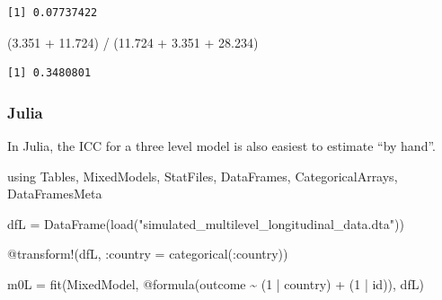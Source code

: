 \documentclass[
  letterpaper,
  DIV=11,
  numbers=noendperiod]{scrreprt}
\newenvironment{Shaded}{\begin{snugshade}}{\end{snugshade}}
\newcommand{\BuiltInTok}[1]{\textcolor[rgb]{0.00,0.23,0.31}{#1}}
\newcommand{\FloatTok}[1]{\textcolor[rgb]{0.68,0.00,0.00}{#1}}
\newcommand{\FunctionTok}[1]{\textcolor[rgb]{0.28,0.35,0.67}{#1}}
\newcommand{\ImportTok}[1]{\textcolor[rgb]{0.00,0.46,0.62}{#1}}
\newcommand{\NormalTok}[1]{\textcolor[rgb]{0.00,0.23,0.31}{#1}}
\newcommand{\OperatorTok}[1]{\textcolor[rgb]{0.37,0.37,0.37}{#1}}
\newcommand{\PreprocessorTok}[1]{\textcolor[rgb]{0.68,0.00,0.00}{#1}}
\newcommand{\SpecialCharTok}[1]{\textcolor[rgb]{0.37,0.37,0.37}{#1}}
\newcommand{\StringTok}[1]{\textcolor[rgb]{0.13,0.47,0.30}{#1}}
\begin{document}
\begin{verbatim}
[1] 0.07737422
\end{verbatim}

\begin{Shaded}
\begin{Highlighting}[]
\NormalTok{(}\FloatTok{3.351} \SpecialCharTok{+} \FloatTok{11.724}\NormalTok{) }\SpecialCharTok{/}\NormalTok{ (}\FloatTok{11.724} \SpecialCharTok{+} \FloatTok{3.351} \SpecialCharTok{+} \FloatTok{28.234}\NormalTok{)}
\end{Highlighting}
\end{Shaded}

\begin{verbatim}
[1] 0.3480801
\end{verbatim}

\subsubsection{Julia}

In Julia, the ICC for a three level model is also easiest to estimate
``by hand''.

\begin{Shaded}
\begin{Highlighting}[]
\ImportTok{using} \BuiltInTok{Tables}\NormalTok{, }\BuiltInTok{MixedModels}\NormalTok{, }\BuiltInTok{StatFiles}\NormalTok{, }\BuiltInTok{DataFrames}\NormalTok{, }\BuiltInTok{CategoricalArrays}\NormalTok{, }\BuiltInTok{DataFramesMeta}

\NormalTok{dfL }\OperatorTok{=} \FunctionTok{DataFrame}\NormalTok{(}\FunctionTok{load}\NormalTok{(}\StringTok{"simulated\_multilevel\_longitudinal\_data.dta"}\NormalTok{))}
\end{Highlighting}
\end{Shaded}

\begin{Shaded}
\begin{Highlighting}[]
\PreprocessorTok{@transform}\NormalTok{!(dfL, }\OperatorTok{:}\NormalTok{country }\OperatorTok{=} \FunctionTok{categorical}\NormalTok{(}\OperatorTok{:}\NormalTok{country))}
\end{Highlighting}
\end{Shaded}

\begin{Shaded}
\begin{Highlighting}[]

\NormalTok{m0L }\OperatorTok{=} \FunctionTok{fit}\NormalTok{(MixedModel, }\PreprocessorTok{@formula}\NormalTok{(outcome }\OperatorTok{\textasciitilde{}} 
\NormalTok{                                 (}\FloatTok{1} \OperatorTok{|}\NormalTok{ country) }\OperatorTok{+} 
\NormalTok{                                 (}\FloatTok{1} \OperatorTok{|}\NormalTok{ id)), dfL)}
\end{Highlighting}
\end{Shaded}
\end{document}
